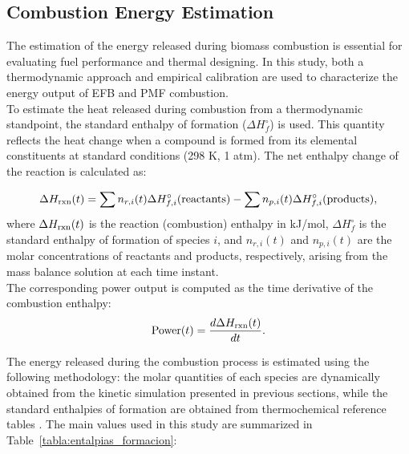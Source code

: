 \documentclass[preprint,12pt]{elsarticle}
\begin{document}
\subsection{Combustion Energy Estimation} 
\label{energy_section}

The estimation of the energy released during biomass combustion is essential for evaluating fuel performance and thermal designing. In this study, both a thermodynamic approach and empirical calibration are used to characterize the energy output of EFB and PMF combustion.\\

To estimate the heat released during combustion from a thermodynamic standpoint, the standard enthalpy of formation ($\Delta H_f^\circ$) is used. This quantity reflects the heat change when a compound is formed from its elemental constituents at standard conditions (298 K, 1 atm). The net enthalpy change of the reaction is calculated as:

\begin{equation}
    \Delta H_{\rm rxn}(t) = \sum n_{r,i}(t) \Delta H_{f,i}^{\circ}(\text{reactants}) - \sum n_{p,i}(t) \Delta H_{f,i}^{\circ}(\text{products}),
\end{equation}
where $\Delta H_{\rm rxn}(t)$ is the reaction (combustion) enthalpy in kJ/mol, $\Delta H_f^\circ$ is the standard enthalpy of formation of species $i$, and $n_{r,i}(t)$ and $n_{p,i}(t)$ are the molar concentrations of reactants and products, respectively, arising from the mass balance solution at each time instant. \\ %

The corresponding power output is computed as the time derivative of the combustion enthalpy:
\begin{equation}
\text{Power}(t) = \frac{d\Delta H_{\rm rxn}(t)}{dt}.
\end{equation}

The energy released during the combustion process is estimated using the following methodology: the molar quantities of each species are dynamically obtained from the kinetic simulation presented in previous sections, while the standard enthalpies of formation are obtained from thermochemical reference tables \cite{AtkinsPChem}. The main values used in this study are summarized in Table~\ref{tabla:entalpias_formacion}:\\
\end{document}
